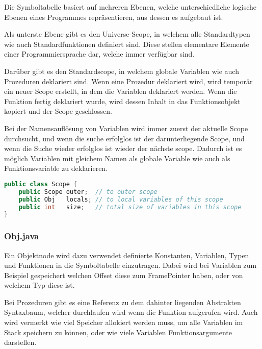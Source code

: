 Die Symboltabelle basiert auf mehreren Ebenen, welche unterschiedliche logische Ebenen eines Programmes repr\"asentieren, aus dessen es aufgebaut ist.

Als unterste Ebene gibt es den Universe-Scope, in welchem alle Standardtypen wie auch Standardfunktionen definiert sind. Diese stellen elementare Elemente einer Programmiersprache dar, welche immer verf\"ugbar sind.

Dar\"uber gibt es den Standardscope, in welchem globale Variablen wie auch Prozeduren deklariert sind. Wenn eine Prozedur deklariert wird, wird tempor\"ar ein neuer Scope erstellt, in dem die Variablen deklariert werden. Wenn die Funktion fertig deklariert wurde, wird dessen Inhalt in das Funktionsobjekt kopiert und der Scope geschlossen.

Bei der Namensaufl\"osung von Variablen wird immer zuerst der aktuelle Scope durchsucht, und wenn die suche erfolglos ist der darunterliegende Scope, und wenn die Suche wieder erfolglos ist wieder der n\"achste scope. Dadurch ist es m\"oglich Variablen mit gleichem Namen als globale Variable wie auch als Funktionsvariable zu deklarieren.

\begin{lstlisting}[language=Java]
public class Scope {
	public Scope outer;  // to outer scope
	public Obj   locals; // to local variables of this scope
	public int   size;   // total size of variables in this scope
}
\end{lstlisting}

\subsubsection{Obj.java}

Ein Objektnode wird dazu verwendet definierte Konstanten, Variablen, Typen und Funktionen in die Symboltabelle einzutragen. Dabei wird bei Variablen zum Beispiel gespeichert welchen Offset diese zum FramePointer haben, oder von welchem Typ diese ist.

Bei Prozeduren gibt es eine Referenz zu dem dahinter liegenden Abstrakten Syntaxbaum, welcher durchlaufen wird wenn die Funktion aufgerufen wird. Auch wird vermerkt wie viel Speicher allokiert werden muss, um alle Variablen im Stack speichern zu k\"onnen, oder wie viele Variablen Funktionsargumente darstellen.

